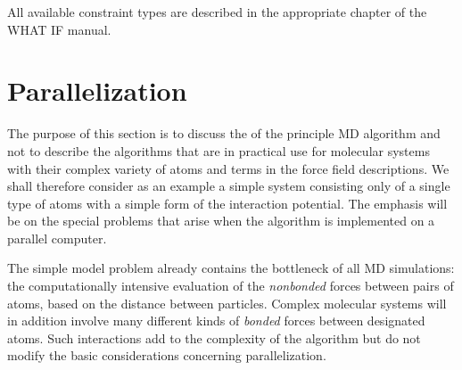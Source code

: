 All available constraint types are described in the appropriate chapter
of the WHAT IF \cite{Whatif} manual.



\section{Parallelization}
\label{sec:par}

\newcommand{\abs}[1]{\mid \! {#1} \! \mid}

The purpose of this section is to discuss the 
 of the 
principle MD algorithm and not to describe the algorithms that are in 
practical use for molecular systems with their complex variety of atoms 
and terms in the force field descriptions. We shall therefore consider 
as an example a simple system consisting only of a single type of atoms 
with a simple form of the interaction potential. The emphasis will be 
on the special problems that arise when the algorithm is implemented on 
a parallel computer. 

The simple model problem already contains the bottleneck of all MD 
simulations: the computationally intensive evaluation of the 
{\em nonbonded} forces between pairs of atoms, based on the distance 
between particles. Complex molecular systems will in addition 
involve many different kinds of {\em bonded} forces between designated 
atoms. Such interactions add to the complexity of the algorithm but do 
not modify the basic considerations concerning parallelization.


